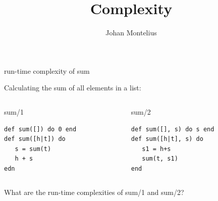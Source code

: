 

\title[ID1019 Complexity]{Complexity}


\author{Johan Montelius}
\date{\semester}



\begin{frame}
\titlepage
\end{frame}

\begin{frame}[fragile]{run-time complexity of sum}

Calculating the sum of all elements in a list:

\pause\vspace{20pt}

\begin{columns}
   \begin{column}{.5\linewidth}
     \begin{block}{sum/1}
       \begin{verbatim}
def sum([]) do 0 end
def sum([h|t]) do 
   s = sum(t)
   h + s
edn
       \end{verbatim}
      \end{block}
    \end{column}
\pause
    \begin{column}{.5\linewidth}
     \begin{block}{sum/2}
       \begin{verbatim}
def sum([], s) do s end
def sum([h|t], s) do
   s1 = h+s 
   sum(t, s1)
end
       \end{verbatim}
      \end{block}
    \end{column}
  \end{columns}

\pause\vspace{20pt}
What are the run-time complexities of sum/1 and sum/2?

\end{frame}

